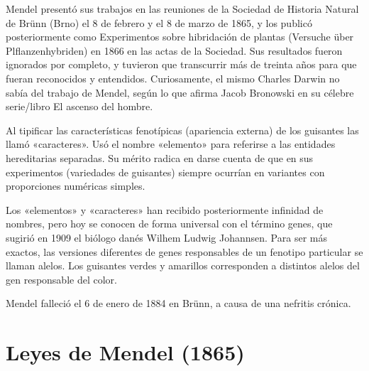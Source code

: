 \documentclass{report}
\begin{document}
Mendel presentó sus trabajos en las reuniones de la Sociedad de Historia Natural de Brünn\cite{Mendel1901} (Brno) el 8 de febrero y el 8 de marzo de 1865, y los publicó posteriormente como Experimentos sobre hibridación de plantas (Versuche über Plflanzenhybriden) en 1866 en las actas de la Sociedad. Sus resultados fueron ignorados por completo, y tuvieron que transcurrir más de treinta años para que fueran reconocidos y entendidos.\cite{Bowler2003} Curiosamente, el mismo Charles Darwin no sabía del trabajo de Mendel, según lo que afirma Jacob Bronowski en su célebre serie/libro El ascenso del hombre.\cite{bronowski2011ascent}

Al tipificar las características fenotípicas (apariencia externa) de los guisantes las llamó «caracteres». Usó el nombre «elemento» para referirse a las entidades hereditarias separadas. Su mérito radica en darse cuenta de que en sus experimentos (variedades de guisantes) siempre ocurrían en variantes con proporciones numéricas simples.

Los «elementos» y «caracteres» han recibido posteriormente infinidad de nombres, pero hoy se conocen de forma universal con el término genes, que sugirió en 1909 el biólogo danés Wilhem Ludwig Johannsen. Para ser más exactos, las versiones diferentes de genes responsables de un fenotipo particular se llaman alelos. Los guisantes verdes y amarillos corresponden a distintos alelos del gen responsable del color.

Mendel falleció el 6 de enero de 1884 en Brünn, a causa de una nefritis crónica.

\chapter{Leyes de Mendel (1865)}
\end{document}
